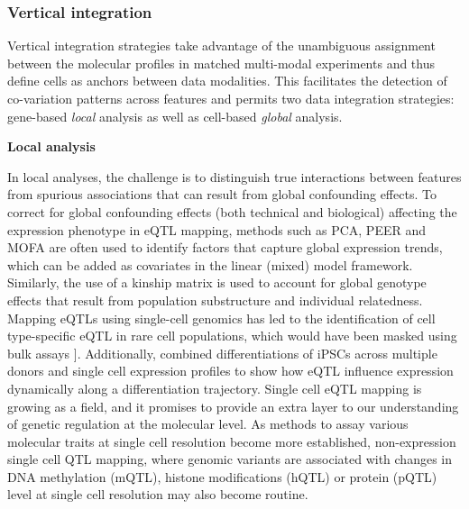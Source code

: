 \subsubsection{Vertical integration}

Vertical integration strategies take advantage of the unambiguous assignment between the molecular profiles in matched multi-modal experiments and thus define cells as anchors between data modalities. This facilitates the detection of co-variation patterns across features and permits two data integration strategies: gene-based \textit{local} analysis as well as cell-based \textit{global} analysis.

\textbf{Local analysis}

In local analyses, the challenge is to distinguish true interactions between features from spurious associations that can result from global confounding effects. To correct for global confounding effects (both technical and biological) affecting the expression phenotype in eQTL mapping, methods such as PCA, PEER \cite{xXX} and MOFA \cite{Argelaguet2018} are often used to identify factors that capture global expression trends, which can be added as covariates in the linear (mixed) model framework. Similarly, the use of a kinship matrix is used to account for global genotype effects that result from population substructure and individual relatedness. Mapping eQTLs using single-cell genomics has led to the identification of cell type-specific eQTL in rare cell populations, which would have been masked using bulk assays \cite{VanDerWijst2018}]. Additionally, \cite{Cuomo2020} combined differentiations of iPSCs across multiple donors and single cell expression profiles to show how eQTL influence expression dynamically along a differentiation trajectory. Single cell eQTL mapping is growing as a field, and it promises to provide an extra layer to our understanding of genetic regulation at the molecular level. As methods to assay various molecular traits at single cell resolution become more established, non-expression single cell QTL mapping, where genomic variants are associated with changes in DNA methylation (mQTL), histone modifications (hQTL) or protein (pQTL) level at single cell resolution may also become routine.


